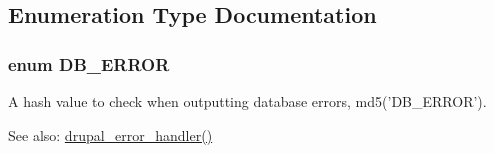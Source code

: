 \subsection{Enumeration Type Documentation}
\hypertarget{database_8inc_ba3c5d3a94c518ed8546dd33091b1939}{
\subsubsection[{DB\_\-ERROR}]{\setlength{\rightskip}{0pt plus 5cm}enum {\bf DB\_\-ERROR}}}
\label{database_8inc_ba3c5d3a94c518ed8546dd33091b1939}


A hash value to check when outputting database errors, md5('DB\_\-ERROR').

\begin{Desc}
\item[See also:]\hyperlink{common_8inc_32d79f124e1b94540b0b4edbde95a892}{drupal\_\-error\_\-handler()} \end{Desc}
